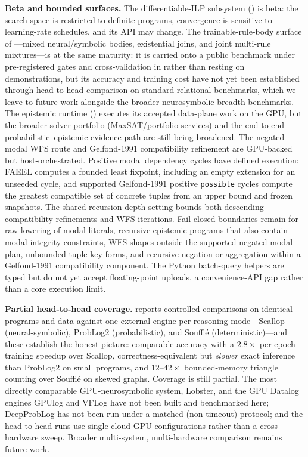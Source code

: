 \textbf{Beta and bounded surfaces.} The differentiable-ILP subsystem () is beta: the search space is restricted to definite programs, convergence is sensitive to learning-rate schedules, and its API may change. The trainable-rule-body surface of ---mixed neural/symbolic bodies, existential joins, and joint multi-rule mixtures---is at the same maturity: it is carried onto a public benchmark under pre-registered gates and cross-validation in  rather than resting on demonstrations, but its accuracy and training cost have not yet been established through head-to-head comparison on standard relational benchmarks, which we leave to future work alongside the broader neurosymbolic-breadth benchmarks. The epistemic runtime () executes its accepted data-plane work on the GPU, but the broader solver portfolio (MaxSAT/portfolio services) and the end-to-end probabilistic--epistemic evidence path are still being broadened. The negated-modal WFS route and Gelfond-1991 compatibility refinement are GPU-backed but host-orchestrated. Positive modal dependency cycles have defined execution: FAEEL computes a founded least fixpoint, including an empty extension for an unseeded cycle, and supported Gelfond-1991 positive \texttt{possible} cycles compute the greatest compatible set of concrete tuples from an upper bound and frozen snapshots. The shared recursion-depth setting bounds both descending compatibility refinements and WFS iterations. Fail-closed boundaries remain for raw lowering of modal literals, recursive epistemic programs that also contain modal integrity constraints, WFS shapes outside the supported negated-modal plan, unbounded tuple-key forms, and recursive negation or aggregation within a Gelfond-1991 compatibility component. The Python batch-query helpers are typed but do not yet accept floating-point uploads, a convenience-API gap rather than a core execution limit.

\textbf{Partial head-to-head coverage.}  reports controlled comparisons on identical programs and data against one external engine per reasoning mode---Scallop (neural-symbolic), ProbLog2 (probabilistic), and Soufflé (deterministic)---and these establish the honest picture: comparable accuracy with a $2.8\times$ per-epoch training speedup over Scallop, correctness-equivalent but \emph{slower} exact inference than ProbLog2 on small programs, and $12$--$42\times$ bounded-memory triangle counting over Soufflé on skewed graphs. Coverage is still partial. The most directly comparable GPU-neurosymbolic system, Lobster, and the GPU Datalog engines GPUlog and VFLog have not been built and benchmarked here; DeepProbLog has not been run under a matched (non-timeout) protocol; and the head-to-head runs use single cloud-GPU configurations rather than a cross-hardware sweep. Broader multi-system, multi-hardware comparison remains future work.

